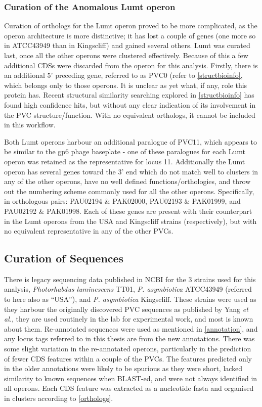 \subsubsection{Curation of the Anomalous Lumt operon}\label{anomalouslumt}
Curation of orthologs for the Lumt operon proved to be more complicated, as the operon architecture is more distinctive; it has lost a couple of genes (one more so in ATCC43949 than in Kingscliff) and gained several others. Lumt was curated last, once all the other operons were clustered effectively. Because of this a few additional CDSs were discarded from the operon for this analysis. Firstly, there is an additional 5' preceding gene, referred to as PVC0 (refer to \vref{structbioinfo}, which belongs only to those operons. It is unclear as yet what, if any, role this protein has. Recent structural similarity searching explored in \vref{structbioinfo} has found high confidence hits, but without any clear indication of its involvement in the PVC structure/function. With no equivalent orthologs, it cannot be included in this workflow.

Both Lumt operons harbour an additional paralogue of PVC11, which appears to be similar to the gp6 phage baseplate - one of these paralogues for each Lumt operon was retained as the representative for locus 11. Additionally the Lumt operon has several genes toward the 3' end which do not match well to clusters in any of the other operons, have no well defined functions/orthologies, and throw out the numbering scheme commonly used for all the other operons. Specifically, in orthologous pairs: PAU02194 \& PAK02000, PAU02193 \& PAK01999, and PAU02192 \& PAK01998. Each of these genes are present with their counterpart in the Lumt operons from the USA and Kingscliff strains (respectively), but with no equivalent representative in any of the other PVCs.


\subsection{Curation of Sequences}
	There is legacy sequencing data published in NCBI for the 3 strains used for this analysis, \emph{Photorhabdus luminescens} TT01, \emph{P. asymbiotica} ATCC43949 (referred to here also as ``USA''), and \emph{P. asymbiotica} Kingscliff. These strains were used as they harbour the originally discovered PVC sequences as published by Yang \emph{et al.}\citep{Yang2006}, they are used routinely in the lab for experimental work, and most is known about them. Re-annotated sequences were used as mentioned in \vref{annotation}, and any locus tags referred to in this thesis are from the new annotations. There was some slight variation in the re-annotated operons, particularly in the prediction of fewer CDS features within a couple of the PVCs. The features predicted only in the older annotations were likely to be spurious as they were short, lacked similarity to known sequences when BLAST-ed, and were not always identified in all operons. Each CDS feature was extracted as a nucleotide fasta and organised in clusters according to \vref{orthologs}. 
	

